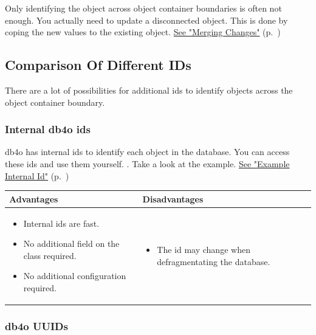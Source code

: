 Only identifying the object across object container boundaries is often not enough. You actually need to update a disconnected object. This is done by coping the new values to the existing object. \hyperref[ref:platform-specific-issues-disconnected-objects-merging-changes]{See "Merging Changes"} (p.~\pageref{ref:platform-specific-issues-disconnected-objects-merging-changes})

\subsection{Comparison Of Different IDs}
\label{ref:platform-specific-issues-disconnected-objects-comparison-of-ids}

There are a lot of possibilities for additional ids to identify objects across the object container boundary.

\subsubsection*{Internal db4o ids}

db4o has internal ids to identify each object in the database. You can access these ids and use them yourself. . Take a look at the example. \hyperref[ref:platform-specific-issues-disconnected-objects-example-internal-id]{See "Example Internal Id"} (p.~\pageref{ref:platform-specific-issues-disconnected-objects-example-internal-id})

{\small
\begin{longtable}{|p{}|p{}|}
\hline
\textbf{Advantages} & \textbf{Disadvantages} \\ \hline
\begin{itemize}
\item Internal ids are fast.
\item No additional field on the class required.
\item No additional configuration required.
\end{itemize} & \begin{itemize}
\item The id may change when defragmentating the database.
\end{itemize} \\ \hline
\end{longtable}}

\subsubsection*{db4o UUIDs}


